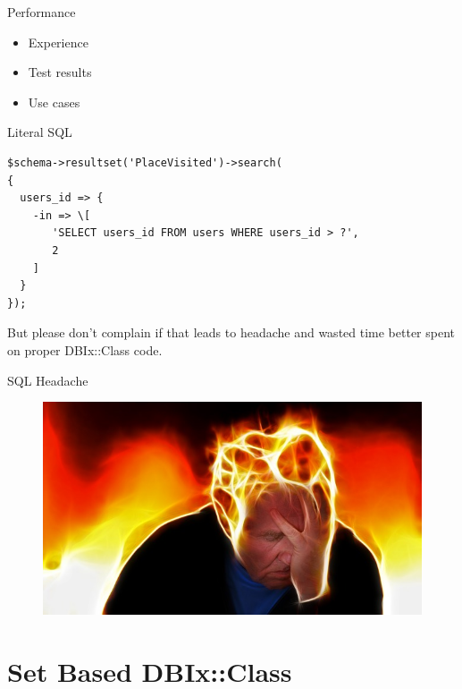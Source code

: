 \begin{frame}{Performance}
\begin{itemize}
\item Experience
\item Test results
\item Use cases
\end{itemize}
\end{frame}

\begin{frame}[fragile]{Literal SQL}
\begin{lstlisting}
$schema->resultset('PlaceVisited')->search(
{
  users_id => {
    -in => \[
       'SELECT users_id FROM users WHERE users_id > ?',
       2
    ]
  }
});
\end{lstlisting}
\end{frame}

But please don't complain if that leads to headache
and wasted time better spent on proper DBIx::Class
code.

\begin{frame}{SQL Headache}
\begin{figure}[!ht]
\centering
\includegraphics[width=1\linewidth]{img/stress.jpg}
\end{figure}
\end{frame}

\section{Set Based DBIx::Class}


